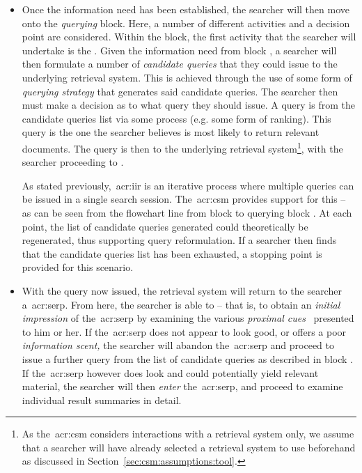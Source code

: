\vspace*{-4mm}
\begin{itemize}
    \item[\blueboxbold{B}]{ Once the information need has been established, the searcher will then move onto the \emph{querying} block. Here, a number of different activities and a decision point are considered. Within the block, the first activity that the searcher will undertake is the . Given the information need from block , a searcher will then formulate a number of \emph{candidate queries} that they could issue to the underlying retrieval system. This is achieved through the use of some form of \emph{querying strategy} that generates said candidate queries. The searcher then must make a decision as to what query they should issue. A query is  from the candidate queries list via some process (e.g. some form of ranking). This query is the one the searcher believes is most likely to return relevant documents. The query is then  to the underlying retrieval system\footnote{As the~\gls{acr:csm} considers interactions with a retrieval system only, we assume that a searcher will have already selected a retrieval system to use beforehand as discussed in Section~\ref{sec:csm:assumptions:tool}.}, with the searcher proceeding to .
    
    As stated previously,~\gls{acr:iir} is an iterative process where multiple queries can be issued in a single search session. The~\gls{acr:csm} provides support for this -- as can be seen from the flowchart line from block  to querying block . At each point, the list of candidate queries generated could theoretically be regenerated, thus supporting query reformulation. If a searcher then finds that the candidate queries list has been exhausted, a stopping point is provided for this scenario.}
        
    \item[\blueboxbold{C}]{ With the query now issued, the retrieval system will return to the searcher a~\gls{acr:serp}. From here, the searcher is able to  -- that is, to obtain an \emph{initial impression} of the~\gls{acr:serp} by examining the various \emph{proximal cues}~\citep{chi2001information_scent} presented to him or her. If the~\gls{acr:serp} does not appear to look good, or offers a poor \emph{information scent,} the searcher will abandon the~\gls{acr:serp} and proceed to issue a further query from the list of candidate queries as described in block . If the~\gls{acr:serp} however does look  and could potentially yield relevant material, the searcher will then \emph{enter} the~\gls{acr:serp}, and proceed to examine individual result summaries in detail.}
    

\end{itemize}
